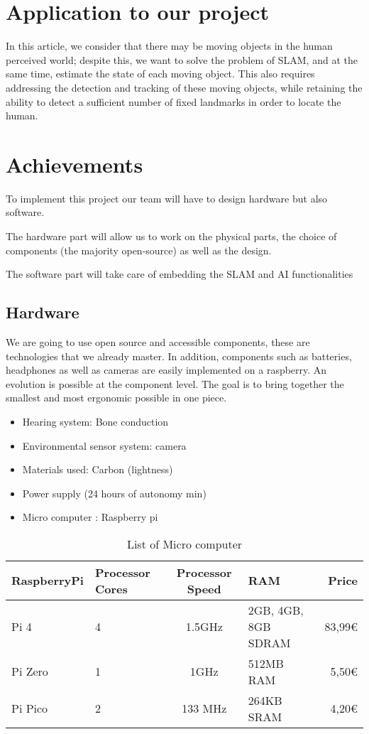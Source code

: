 \documentclass[conference,compsoc]{IEEEtran}
\begin{document}
\section{Application to our project}
In this article, we consider that there may be moving objects in the human perceived world; despite this, we want to solve the problem of SLAM, and at the same time, estimate the state of each moving object. This also requires addressing the detection and tracking of these moving objects, while retaining the ability to detect a sufficient number of fixed landmarks in order to locate the human.

\section{Achievements}
To implement this project our team will have to design hardware but also software.

The hardware part will allow us to work on the physical parts, the choice of components (the majority open-source) as well as the design.

The software part will take care of embedding the SLAM and AI functionalities
\subsection{Hardware}

We are going to use open source and accessible components, these are technologies that we already master. In addition, components such as batteries, headphones as well as cameras are easily implemented on a raspberry. An evolution is possible at the component level. The goal is to bring together the smallest and most ergonomic possible in one piece.

\begin{itemize}
  \item Hearing system: Bone conduction
  \item Environmental sensor system: camera
  \item Materials used: Carbon (lightness)
  \item Power supply (24 hours of autonomy min)
  \item Micro computer : Raspberry pi
\end{itemize}

\begin{table}[h]
\center
\begin{tabular}{|l|m{1cm}|c|m{1.7cm}|r|}
  \hline
  RaspberryPi&Processor Cores&Processor Speed & RAM & Price\\
  \hline
  Pi 4 & 4 & 1.5GHz &2GB, 4GB, 8GB SDRAM&83,99€\\
  Pi Zero & 1 & 1GHz &512MB RAM&5,50€\\
  Pi Pico & 2 & 133 MHz& 264KB SRAM&4,20€\\
  \hline
\end{tabular}
\caption{List of Micro computer}
\label{tab:listOfMicroComputer}
\end{table}
\end{document}
